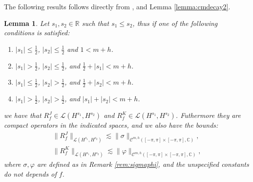 \documentclass{article}
\newtheorem{lemma}[theorem]{Lemma}
\newcommand{\IC}{{\mathbb C}}
\newcommand{\IR}{{\mathbb R}}
\newcommand{\cmspaceh}[4]{\mathcal{C}^{#1,#2} \left( #3, #4 \right)}
\begin{document}
The following results follows directly from \cite[Theorem 6.1.1]{saranen2013periodic}, and Lemma \ref{lemma:cmdecay2}.
\begin{lemma}
\label{lemma:rfper}
Let $s_1, s_2 \in \IR$ such that $s_1 \leq s_2$, thus if one of the following conditions is satisfied: 
\begin{enumerate}
\item $|s_1| \leq \frac{1}{2}$, $|s_2| \leq \frac{1}{2}$ and $1 < m+h$.
\item 
$|s_1| > \frac{1}{2}$, $|s_2| \leq \frac{1}{2}$, and  $\frac{1}{2}+|s_1| < m+h$.
\item 
$|s_1| \leq \frac{1}{2}$, $|s_2|>\frac{1}{2}$, and $\frac{1}{2}+|s_2| < m+h$.
\item 
$|s_1| > \frac{1}{2}$, $|s_2|>\frac{1}{2}$, and $|s_1|+|s_2| < m+h$.
\end{enumerate}
we have that $ R_f^J  \in \mathcal{L}(H^{s_1},H^{s_2})$ and  $R^K_f  \in \mathcal{L}(H^{s_1},H^{s_2})$. Futhermore they are compact operators in the indicated spaces, and we also have the bounds: 
\begin{align*}
\| R_f^J\|_{ \mathcal{L}(H^{s_1},H^{s_2})} \lesssim \|\sigma\|_{\cmspaceh{m}{h}{[-\pi,\pi]\times[-\pi,\pi]}{\IC}},\\
\| R_f^K\|_{ \mathcal{L}(H^{s_1},H^{s_2})} \lesssim \|\varphi\|_{\cmspaceh{m}{h}{[-\pi,\pi]\times[-\pi,\pi]}{\IC}},
\end{align*}
where $\sigma, \varphi$ are defined as in Remark \ref{rem:sigmaphi}, and the unspecified constants do not depends of $f$.
\end{lemma}
\end{document}
